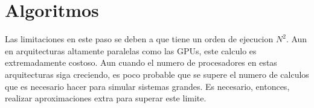 \documentclass[a4paper,10pt]{report}
\begin{document}
\chapter{Algoritmos}
 
 









Las limitaciones en este paso se deben a que tiene un orden de ejecucion $N^2$. Aun en arquitecturas altamente paralelas como las GPUs, este calculo es extremadamente costoso. 
Aun cuando el numero de procesadores en estas arquitecturas siga creciendo, es poco probable que se supere el numero de calculos que es necesario hacer para simular sistemas grandes.
Es necesario, entonces, realizar aproximaciones extra para superar este limite.


% 

\end{document}
